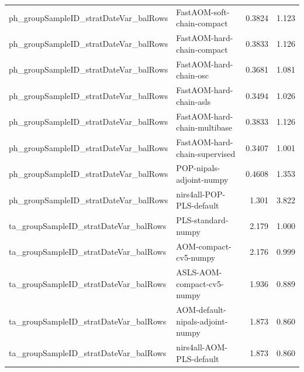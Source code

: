 \begin{landscape}
\begin{longtable}{L{8.0cm}L{9.5cm}rr}
ph\_\allowbreak{}groupSampleID\_\allowbreak{}stratDateVar\_\allowbreak{}balRows & FastAOM-\allowbreak{}soft-\allowbreak{}chain-\allowbreak{}compact & 0.3824 & 1.123 \\
ph\_\allowbreak{}groupSampleID\_\allowbreak{}stratDateVar\_\allowbreak{}balRows & FastAOM-\allowbreak{}hard-\allowbreak{}chain-\allowbreak{}compact & 0.3833 & 1.126 \\
ph\_\allowbreak{}groupSampleID\_\allowbreak{}stratDateVar\_\allowbreak{}balRows & FastAOM-\allowbreak{}hard-\allowbreak{}chain-\allowbreak{}osc & 0.3681 & 1.081 \\
ph\_\allowbreak{}groupSampleID\_\allowbreak{}stratDateVar\_\allowbreak{}balRows & FastAOM-\allowbreak{}hard-\allowbreak{}chain-\allowbreak{}asls & 0.3494 & 1.026 \\
ph\_\allowbreak{}groupSampleID\_\allowbreak{}stratDateVar\_\allowbreak{}balRows & FastAOM-\allowbreak{}hard-\allowbreak{}chain-\allowbreak{}multibase & 0.3833 & 1.126 \\
ph\_\allowbreak{}groupSampleID\_\allowbreak{}stratDateVar\_\allowbreak{}balRows & FastAOM-\allowbreak{}hard-\allowbreak{}chain-\allowbreak{}supervised & 0.3407 & 1.001 \\
ph\_\allowbreak{}groupSampleID\_\allowbreak{}stratDateVar\_\allowbreak{}balRows & POP-\allowbreak{}nipals-\allowbreak{}adjoint-\allowbreak{}numpy & 0.4608 & 1.353 \\
ph\_\allowbreak{}groupSampleID\_\allowbreak{}stratDateVar\_\allowbreak{}balRows & nirs4all-\allowbreak{}POP-\allowbreak{}PLS-\allowbreak{}default & 1.301 & 3.822 \\
ta\_\allowbreak{}groupSampleID\_\allowbreak{}stratDateVar\_\allowbreak{}balRows & PLS-\allowbreak{}standard-\allowbreak{}numpy & 2.179 & 1.000 \\
ta\_\allowbreak{}groupSampleID\_\allowbreak{}stratDateVar\_\allowbreak{}balRows & AOM-\allowbreak{}compact-\allowbreak{}cv5-\allowbreak{}numpy & 2.176 & 0.999 \\
ta\_\allowbreak{}groupSampleID\_\allowbreak{}stratDateVar\_\allowbreak{}balRows & ASLS-\allowbreak{}AOM-\allowbreak{}compact-\allowbreak{}cv5-\allowbreak{}numpy & 1.936 & 0.889 \\
ta\_\allowbreak{}groupSampleID\_\allowbreak{}stratDateVar\_\allowbreak{}balRows & AOM-\allowbreak{}default-\allowbreak{}nipals-\allowbreak{}adjoint-\allowbreak{}numpy & 1.873 & 0.860 \\
ta\_\allowbreak{}groupSampleID\_\allowbreak{}stratDateVar\_\allowbreak{}balRows & nirs4all-\allowbreak{}AOM-\allowbreak{}PLS-\allowbreak{}default & 1.873 & 0.860 \\

\end{longtable}
\end{landscape}
